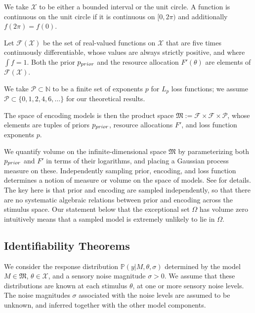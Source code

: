 We take $\mathcal{X}$ to be either a bounded interval or the unit circle. %
A function is continuous on the unit circle if it is continuous on $[0,2\pi)$ and additionally $f(2\pi) = f(0)$. 


Let $\mathcal{F}(\mathcal{X})$ be the set of real-valued functions on $\mathcal{X}$ that are five times continuously differentiable, whose values are always strictly positive, and where $\int f = 1$. Both the prior $p_{prior}$ and the resource allocation $F'(\theta)$ are elements of $\mathcal{F}(\mathcal{X})$.

We take $\mathcal{P} \subset \mathbb{N}$ to be a finite set of exponents $p$ for $L_p$ loss functions; we assume $\mathcal{P} \subset \{0,1,2,4,6,\dots\}$ for our theoretical results.

The space of encoding models is then the product space $\mathfrak{M} := \mathcal{F} \times \mathcal{F} \times \mathcal{P}$, whose elements are tuples of priors $p_{prior}$, resource allocations $F'$, and loss function exponents $p$.



We quantify volume on the infinite-dimensional space $\mathfrak{M}$ by %
parameterizing both $p_{prior}$ and $F'$ in terms of their logarithms, and placing a Gaussian process measure on these.
Independently sampling prior, encoding, and loss function determines a notion of measure or volume on the space of models.
See  for details.
%
%
%
The key here is that prior and encoding are sampled independently, so that there are no systematic algebraic relations between prior and encoding across the stimulus space. Our statement below that the exceptional set $\Omega$ has volume zero intuitively means that a sampled model is extremely unlikely to lie in $\Omega$.
%

%


\subsection*{Identifiability Theorems}
We consider the response distribution
$\mathbb{P}(y|M,\theta, \sigma)$
determined by the model $M \in \mathfrak{M}$, $\theta \in \mathcal{X}$, and a sensory noise magnitude $\sigma > 0$.
We assume that these distributions are known at each stimulus $\theta$, at one or more sensory noise levels.
The noise magnitudes $\sigma$ associated with the noise levels are assumed to be unknown, and inferred together with the other model components.
%



